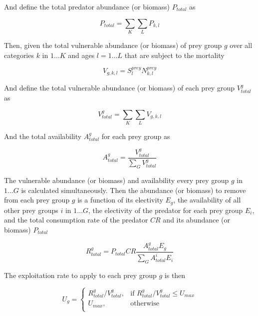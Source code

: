 And define the total predator abundance (or biomass) $P_{total}$ as

\begin{equation}
P_{total}  = \sum\limits_K {\sum\limits_L {P_{k,l}}}
\end{equation}

Then, given the total vulnerable abundance (or biomass) of prey group $g$ over all categories $k$ in $1 \ldots K$ and ages $l = 1 \ldots L$ that are subject to the mortality

\begin{equation}
V_{g,k,l} = S^{prey}_l N^{prey}_{k,l}
\end{equation}

And define the total vulnerable abundance (or biomass) of each prey group $V^g_{total}$ as

\begin{equation}
V^g_{total}  = \sum\limits_K {\sum\limits_L {V_{g,k,l}}}
\end{equation}

And the total availability $A^g_{total}$ for each prey group as

\begin{equation}
A^g_{total} = \frac{V^g_{total}}{\sum\limits_G {V^g_{total}}}
\end{equation}

The vulnerable abundance (or biomass) and availability every prey group $g$ in $1 \ldots G$ is calculated simultaneously. Then the abundance (or biomass) to remove from each prey group $g$ is a function of its electivity $E_g$, the availability of all other prey groups $i$ in $1 \ldots G$, the electivity of the predator for each prey group $E_i$, and the total consumption rate of the predator $CR$ and its abundance (or biomass) $P_{total}$

\begin{equation}
R^g_{total}=P_{total} CR \frac{A^g_{total} E_g}{\sum\limits_G {A^i_{total} E_i}}
\end{equation}

The exploitation rate to apply to each prey group $g$ is then

\begin{equation}
U_g = \begin{cases}
R^g_{total}/V^g_{total}, & \text{if $R^g_{total}/V^g_{total} \leq U_{max}$} \\
U_{max}, & \text{otherwise}\\
\end{cases}
\end{equation}

